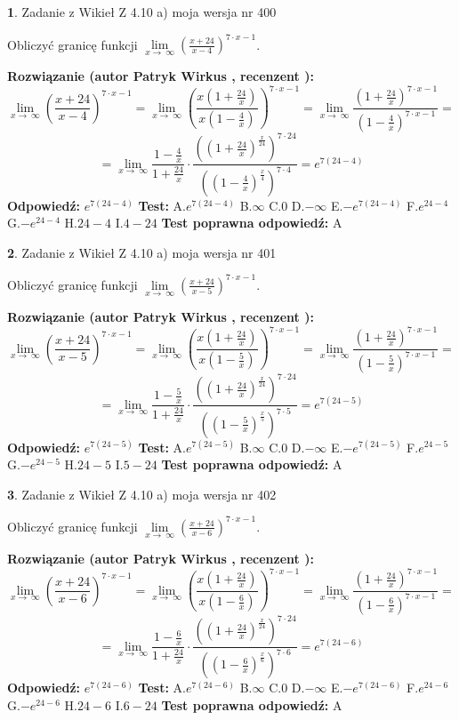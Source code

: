\documentclass[12pt, a4paper]{article}
\theoremstyle{definition} %
\newtheorem{zad}{}
\newcommand{\zadStart}[1]{\begin{zad}#1\newline}
\newcommand{\zadStop}{\end{zad}}
\newcommand{\rozwStart}[2]{\noindent \textbf{Rozwiązanie (autor #1 , recenzent #2): }\newline}
\newcommand{\rozwStop}{\newline}
\newcommand{\odpStart}{\noindent \textbf{Odpowiedź:}\newline}
\newcommand{\odpStop}{\newline}
\newcommand{\testStart}{\noindent \textbf{Test:}\newline}
\newcommand{\testStop}{\newline}
\newcommand{\kluczStart}{\noindent \textbf{Test poprawna odpowiedź:}\newline}
\newcommand{\kluczStop}{\newline}
\begin{document}
\zadStart{Zadanie z Wikieł Z 4.10 a) moja wersja nr 400}


Obliczyć granicę funkcji  $\lim\limits_{x\to\ \infty}(\frac{x+24}{x-4})^{7\cdot x-1}$.
\zadStop
\rozwStart{Patryk Wirkus}{}
$$\lim\limits_{x\to\ \infty}(\frac{x+24}{x-4})^{7\cdot x-1} = \lim\limits_{x\to\ \infty}(\frac{x(1+\frac{24}{x})}{x(1-\frac{4}{x})})^{7\cdot x-1}=\lim\limits_{x\to\ \infty}\frac{(1+\frac{24}{x})^{7\cdot x-1}}{(1-\frac{4}{x})^{7\cdot x-1}}=$$
$$=\lim\limits_{x\to\ \infty}\frac{1-\frac{4}{x}}{1+\frac{24}{x}}\cdot\frac{((1+\frac{24}{x})^{\frac{x}{24}})^{7\cdot24}}{((1-\frac{4}{x})^{\frac{x}{4}})^{7\cdot4}}=e^{7(24-4)}$$
\rozwStop
\odpStart
$e^{7(24-4)}$
\odpStop
\testStart
A.$e^{7(24-4)}$ B.$\infty$ C.$0$ D.$-\infty$ E.$-e^{7(24-4)}$
F.$e^{24-4}$ G.$-e^{24-4}$
H.$24-4$
I.$4-24$
\testStop
\kluczStart
A
\kluczStop



\zadStart{Zadanie z Wikieł Z 4.10 a) moja wersja nr 401}


Obliczyć granicę funkcji  $\lim\limits_{x\to\ \infty}(\frac{x+24}{x-5})^{7\cdot x-1}$.
\zadStop
\rozwStart{Patryk Wirkus}{}
$$\lim\limits_{x\to\ \infty}(\frac{x+24}{x-5})^{7\cdot x-1} = \lim\limits_{x\to\ \infty}(\frac{x(1+\frac{24}{x})}{x(1-\frac{5}{x})})^{7\cdot x-1}=\lim\limits_{x\to\ \infty}\frac{(1+\frac{24}{x})^{7\cdot x-1}}{(1-\frac{5}{x})^{7\cdot x-1}}=$$
$$=\lim\limits_{x\to\ \infty}\frac{1-\frac{5}{x}}{1+\frac{24}{x}}\cdot\frac{((1+\frac{24}{x})^{\frac{x}{24}})^{7\cdot24}}{((1-\frac{5}{x})^{\frac{x}{5}})^{7\cdot5}}=e^{7(24-5)}$$
\rozwStop
\odpStart
$e^{7(24-5)}$
\odpStop
\testStart
A.$e^{7(24-5)}$ B.$\infty$ C.$0$ D.$-\infty$ E.$-e^{7(24-5)}$
F.$e^{24-5}$ G.$-e^{24-5}$
H.$24-5$
I.$5-24$
\testStop
\kluczStart
A
\kluczStop



\zadStart{Zadanie z Wikieł Z 4.10 a) moja wersja nr 402}


Obliczyć granicę funkcji  $\lim\limits_{x\to\ \infty}(\frac{x+24}{x-6})^{7\cdot x-1}$.
\zadStop
\rozwStart{Patryk Wirkus}{}
$$\lim\limits_{x\to\ \infty}(\frac{x+24}{x-6})^{7\cdot x-1} = \lim\limits_{x\to\ \infty}(\frac{x(1+\frac{24}{x})}{x(1-\frac{6}{x})})^{7\cdot x-1}=\lim\limits_{x\to\ \infty}\frac{(1+\frac{24}{x})^{7\cdot x-1}}{(1-\frac{6}{x})^{7\cdot x-1}}=$$
$$=\lim\limits_{x\to\ \infty}\frac{1-\frac{6}{x}}{1+\frac{24}{x}}\cdot\frac{((1+\frac{24}{x})^{\frac{x}{24}})^{7\cdot24}}{((1-\frac{6}{x})^{\frac{x}{6}})^{7\cdot6}}=e^{7(24-6)}$$
\rozwStop
\odpStart
$e^{7(24-6)}$
\odpStop
\testStart
A.$e^{7(24-6)}$ B.$\infty$ C.$0$ D.$-\infty$ E.$-e^{7(24-6)}$
F.$e^{24-6}$ G.$-e^{24-6}$
H.$24-6$
I.$6-24$
\testStop
\kluczStart
A
\kluczStop
\end{document}
